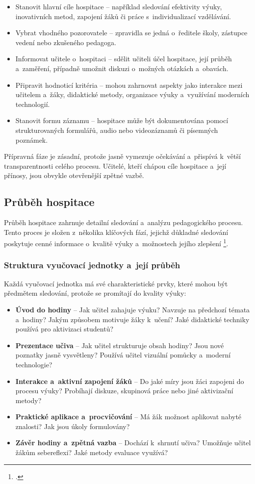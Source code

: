 \begin{itemize}
    \item Stanovit hlavní cíle hospitace – například sledování efektivity výuky, inovativních metod, zapojení žáků či práce s~individualizací vzdělávání.
    \item Vybrat vhodného pozorovatele – zpravidla se jedná o~ředitele školy, zástupce vedení nebo zkušeného pedagoga.
    \item Informovat učitele o~hospitaci – sdělit učiteli účel hospitace, její průběh a~zaměření, případně umožnit diskuzi o~možných otázkách a~obavách.
    \item Připravit hodnoticí kritéria – mohou zahrnovat aspekty jako interakce mezi učitelem a~žáky, didaktické metody, organizace výuky a~využívání moderních technologií.
    \item Stanovit formu záznamu – hospitace může být dokumentována pomocí strukturovaných formulářů, audio nebo videozáznamů či písemných poznámek.
\end{itemize}

Přípravná fáze je zásadní, protože jasně vymezuje očekávání a~přispívá k~větší transparentnosti celého procesu. Učitelé, kteří chápou cíle hospitace a~její přínosy, jsou obvykle otevřenější zpětné vazbě.

\subsection{Průběh hospitace}
Průběh hospitace zahrnuje detailní sledování a~analýzu pedagogického procesu. Tento proces je složen z~několika klíčových fází, jejichž důkladné sledování poskytuje cenné informace o~kvalitě výuky a~možnostech jejího zlepšení \footcite[132]{ped-proces-rizeni}.

\subsubsection{Struktura vyučovací jednotky a~její průběh}
Každá vyučovací jednotka má své charakteristické prvky, které mohou být předmětem sledování, protože se promítají do kvality výuky:
\begin{itemize}
    \item \textbf{Úvod do hodiny} – Jak učitel zahajuje výuku? Navzuje na předchozí témata a~hodiny? Jakým způsobem motivuje žáky k~učení? Jaké didaktické techniky používá pro aktivizaci studentů?
    \item \textbf{Prezentace učiva} – Jak učitel strukturuje obsah hodiny? Jsou nové poznatky jasně vysvětleny? Používá učitel vizuální pomůcky a~moderní technologie?
    \item \textbf{Interakce a~aktivní zapojení žáků} – Do jaké míry jsou žáci zapojeni do procesu výuky? Probíhají diskuze, skupinová práce nebo jiné aktivizační metody?
    \item \textbf{Praktické aplikace a~procvičování} – Má žák možnost aplikovat nabyté znalosti? Jak jsou úkoly formulovány?
    \item \textbf{Závěr hodiny a~zpětná vazba} – Dochází k~shrnutí učiva? Umožňuje učitel žákům sebereflexi? Jaké metody evaluace využívá?
\end{itemize}

